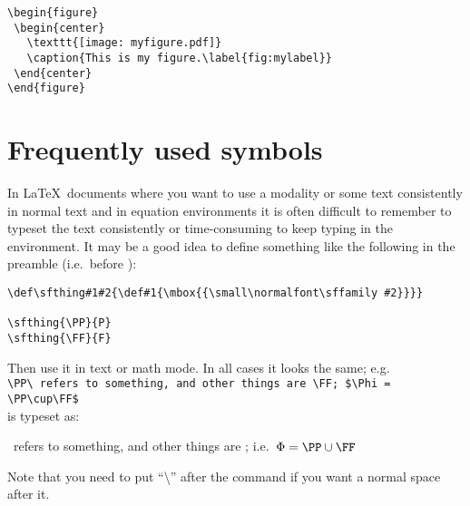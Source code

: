 \begin{verbatim}
\begin{figure}
 \begin{center}
   \texttt{[image: myfigure.pdf]}    
   \caption{This is my figure.\label{fig:mylabel}}
 \end{center}
\end{figure}
\end{verbatim}

\section{Frequently used symbols\label{sec:fus}}

In \LaTeX\ documents where you want to use a modality or some text consistently in normal text and in equation environments it is often difficult to remember to typeset the text consistently or time-consuming to keep typing in the environment. It may be a good idea to define something like the following in the preamble (i.e.\ before \verb++):

\begin{verbatim}
\def\sfthing#1#2{\def#1{\mbox{{\small\normalfont\sffamily #2}}}}

\sfthing{\PP}{P}
\sfthing{\FF}{F}
\end{verbatim}

Then use it in text or math mode. In all cases it looks the same; e.g.\\
\verb+\PP\ refers to something, and other things are \FF; $\Phi = \PP\cup\FF$+\\
is typeset as:

\PP\ refers to something, and other things are \FF; i.e.\ $\Phi = \PP\cup\FF$

Note that you need to put ``\textbackslash'' after the command if you want a normal space after it.
